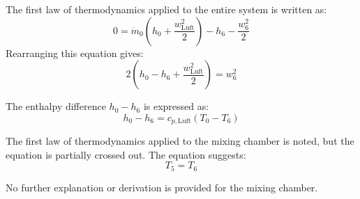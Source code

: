 The first law of thermodynamics applied to the entire system is written as:  
\[
0 = \dot{m}_0 \left( h_0 + \frac{w_{\text{Luft}}^2}{2} \right) - h_6 - \frac{w_6^2}{2}
\]  
Rearranging this equation gives:  
\[
2 \left( h_0 - h_6 + \frac{w_{\text{Luft}}^2}{2} \right) = w_6^2
\]  

The enthalpy difference \( h_0 - h_6 \) is expressed as:  
\[
h_0 - h_6 = c_{p,\text{Luft}} \left( T_0 - T_6 \right)
\]  

The first law of thermodynamics applied to the mixing chamber is noted, but the equation is partially crossed out. The equation suggests:  
\[
T_5 = T_6
\]  

No further explanation or derivation is provided for the mixing chamber.